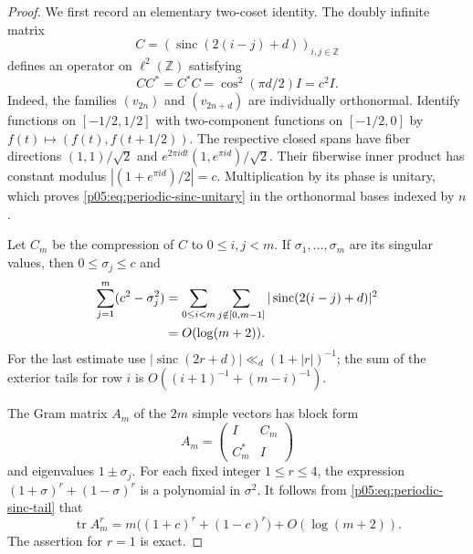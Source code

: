 \documentclass[11pt,letterpaper]{article}
\theoremstyle{definition}
\theoremstyle{remark}
\newcommand{\1}{\mathbf 1}
\begin{document}
\begin{proof}
We first record an elementary two-coset identity.  The doubly
infinite matrix
\[
 C=(\operatorname{sinc}(2(i-j)+d))_{i,j\in\mathbb Z}
\]
defines an operator on $\ell^2(\mathbb Z)$ satisfying
\begin{equation}\label{p05:eq:periodic-sinc-unitary}
 CC^*=C^*C=\cos^2(\pi d/2)I=c^2I.
\end{equation}
Indeed, the families $(v_{2n})$ and $(v_{2n+d})$ are individually
orthonormal.  Identify functions on $[-1/2,1/2]$ with two-component
functions on $[-1/2,0]$ by $f(t)\mapsto(f(t),f(t+1/2))$.
The respective closed spans have fiber directions
$(1,1)/\sqrt2$ and
$e^{2\pi idt}(1,e^{\pi id})/\sqrt2$.
Their fiberwise inner product has constant modulus
$|(1+e^{\pi id})/2|=c$.  Multiplication by its phase is unitary,
which proves \eqref{p05:eq:periodic-sinc-unitary} in the orthonormal
bases indexed by $n$.

Let $C_m$ be the compression of $C$ to $0\le i,j<m$.
If $\sigma_1,\ldots,\sigma_m$ are its singular values, then
$0\le\sigma_j\le c$ and
\begin{align}
 \sum_{j=1}^m(c^2-\sigma_j^2)
 &=\sum_{0\le i<m}\sum_{j\notin[0,m-1]}
             |\operatorname{sinc}(2(i-j)+d)|^2\notag\\
 &=O(\log(m+2)).\label{p05:eq:periodic-sinc-tail}
\end{align}
For the last estimate use
$|\operatorname{sinc}(2r+d)|\ll_d(1+|r|)^{-1}$;
the sum of the exterior tails for row $i$ is
$O((i+1)^{-1}+(m-i)^{-1})$.

The Gram matrix $A_m$ of the $2m$ simple vectors has block form
\[
 A_m=\begin{pmatrix}I&C_m\\ C_m^*&I\end{pmatrix}
\]
and eigenvalues $1\pm\sigma_j$.  For each fixed integer
$1\le r\le4$, the expression
$(1+\sigma)^r+(1-\sigma)^r$ is a polynomial in $\sigma^2$.
It follows from \eqref{p05:eq:periodic-sinc-tail} that
\begin{equation}\label{p05:eq:periodic-sinc-simple-moments}
 \operatorname{tr}A_m^r
 =m\bigl((1+c)^r+(1-c)^r\bigr)+O(\log(m+2)).
\end{equation}
The assertion for $r=1$ is exact.


\end{proof}
\end{document}
